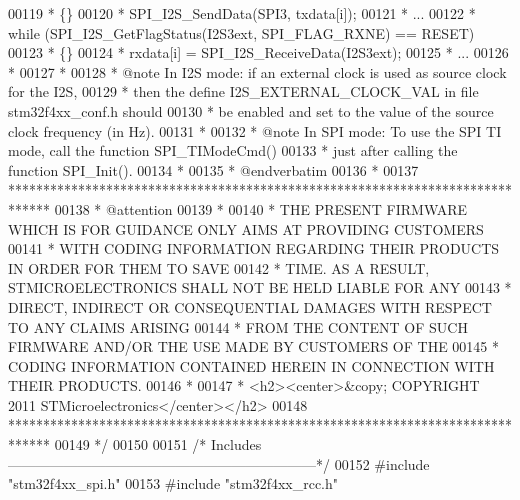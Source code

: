 \begin{DoxyCode}
00119 \textcolor{comment}{  *          \{\}}
00120 \textcolor{comment}{  *          SPI\_I2S\_SendData(SPI3, txdata[i]);}
00121 \textcolor{comment}{  *          ...  }
00122 \textcolor{comment}{  *          while (SPI\_I2S\_GetFlagStatus(I2S3ext, SPI\_FLAG\_RXNE) == RESET)}
00123 \textcolor{comment}{  *          \{\}}
00124 \textcolor{comment}{  *          rxdata[i] = SPI\_I2S\_ReceiveData(I2S3ext);}
00125 \textcolor{comment}{  *          ...          }
00126 \textcolor{comment}{  *              }
00127 \textcolor{comment}{  *     }
00128 \textcolor{comment}{  * @note    In I2S mode: if an external clock is used as source clock for the I2S,  }
00129 \textcolor{comment}{  *          then the define I2S\_EXTERNAL\_CLOCK\_VAL in file stm32f4xx\_conf.h should }
00130 \textcolor{comment}{  *          be enabled and set to the value of the source clock frequency (in Hz).}
00131 \textcolor{comment}{  * }
00132 \textcolor{comment}{  * @note    In SPI mode: To use the SPI TI mode, call the function SPI\_TIModeCmd() }
00133 \textcolor{comment}{  *          just after calling the function SPI\_Init().}
00134 \textcolor{comment}{  *}
00135 \textcolor{comment}{  *  @endverbatim  }
00136 \textcolor{comment}{  *                                  }
00137 \textcolor{comment}{  ******************************************************************************}
00138 \textcolor{comment}{  * @attention}
00139 \textcolor{comment}{  *}
00140 \textcolor{comment}{  * THE PRESENT FIRMWARE WHICH IS FOR GUIDANCE ONLY AIMS AT PROVIDING CUSTOMERS}
00141 \textcolor{comment}{  * WITH CODING INFORMATION REGARDING THEIR PRODUCTS IN ORDER FOR THEM TO SAVE}
00142 \textcolor{comment}{  * TIME. AS A RESULT, STMICROELECTRONICS SHALL NOT BE HELD LIABLE FOR ANY}
00143 \textcolor{comment}{  * DIRECT, INDIRECT OR CONSEQUENTIAL DAMAGES WITH RESPECT TO ANY CLAIMS ARISING}
00144 \textcolor{comment}{  * FROM THE CONTENT OF SUCH FIRMWARE AND/OR THE USE MADE BY CUSTOMERS OF THE}
00145 \textcolor{comment}{  * CODING INFORMATION CONTAINED HEREIN IN CONNECTION WITH THEIR PRODUCTS.}
00146 \textcolor{comment}{  *}
00147 \textcolor{comment}{  * <h2><center>&copy; COPYRIGHT 2011 STMicroelectronics</center></h2>}
00148 \textcolor{comment}{  ******************************************************************************  }
00149 \textcolor{comment}{  */}
00150 
00151 \textcolor{comment}{/* Includes ------------------------------------------------------------------*/}
00152 \textcolor{preprocessor}{#}\textcolor{preprocessor}{include} "stm32f4xx_spi.h"
00153 \textcolor{preprocessor}{#}\textcolor{preprocessor}{include} "stm32f4xx_rcc.h"

\end{DoxyCode}
